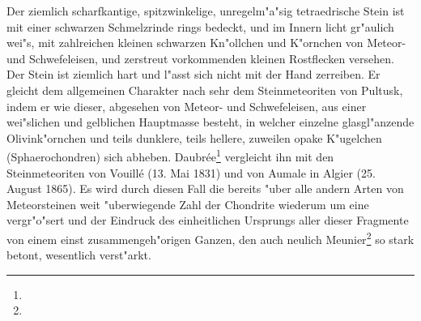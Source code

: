 \documentclass[a4paper, 11pt, oneside]{article}
\begin{document}
Der ziemlich scharfkantige, spitzwinkelige, unregelm"a"sig tetraedrische Stein ist mit einer schwarzen Schmelzrinde rings bedeckt, und im Innern licht gr"aulich wei"s, mit zahlreichen kleinen schwarzen Kn"ollchen und K"ornchen von Meteor- und Schwefeleisen, und zerstreut vorkommenden kleinen Rostflecken versehen. Der Stein ist ziemlich hart und l"asst sich nicht mit der Hand zerreiben. Er gleicht dem allgemeinen Charakter nach sehr dem Steinmeteoriten von Pultusk, indem er wie dieser, abgesehen von Meteor- und Schwefeleisen, aus einer wei"slichen und gelblichen Hauptmasse besteht, in welcher einzelne glasgl"anzende Olivink"ornchen und teils dunklere, teils hellere, zuweilen opake K"ugelchen (Sphaerochondren) sich abheben. Daubrée\footnote{} vergleicht ihn mit den Steinmeteoriten von Vouillé (13. Mai 1831) und von Aumale in Algier (25. August 1865). Es wird durch diesen Fall die bereits "uber alle andern Arten von Meteorsteinen weit "uberwiegende Zahl der Chondrite wiederum um eine vergr"o"sert und der Eindruck des einheitlichen Ursprungs aller dieser Fragmente von einem einst zusammengeh"origen Ganzen, den auch neulich Meunier\footnote{} so stark betont, wesentlich verst"arkt.
\end{document}
